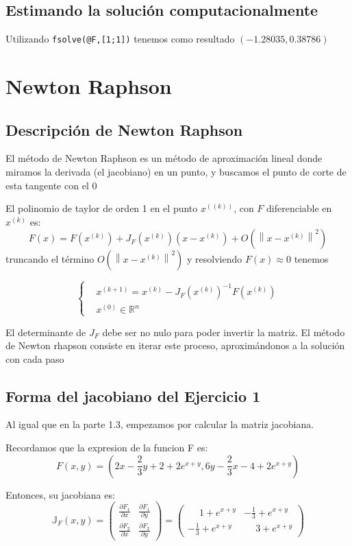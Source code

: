 \documentclass{endm}
\begin{document}
\subsection{Estimando la solución computacionalmente}
Utilizando \lstinline[style=mystyle]{fsolve(@F,[1;1])} tenemos como resultado $(-1.28035, 0.38786)$
\section{Newton Raphson}
\subsection{Descripción de Newton Raphson}
El método de Newton Raphson es un método de aproximación lineal donde miramos la derivada (el jacobiano) en un punto, y buscamos el punto de corte de esta tangente con el 0

El polinomio de taylor de orden 1 en el punto $x^((k))$, con $F$ diferenciable en $x^{(k)}$ es:
\begin{equation*}
F(x) = F(x^{(k)}) + J_F(x^{(k)})(x-x^{(k)})+O(\left \| x-x^{(k)} \right \|^2)
\end{equation*}
truncando el término $O(\left \| x-x^{(k)} \right \|^2)$ y resolviendo $F(x) \approx  0$ tenemos

\begin{equation}
\begin{cases}
 & x^{(k+1)} = x^{(k)} - J_F(x^{(k)})^{-1} F(x^{(k)}) \\
 & x^{(0)}  \in \mathbb{R}^n
\end{cases}
\end{equation}

El determinante de $J_F$ debe ser no nulo para poder invertir la matriz.
El método de Newton rhapson consiste en iterar este proceso, aproximándonos a la solución con cada paso
\subsection{Forma del jacobiano del Ejercicio 1}
Al igual que en la parte 1.3, empezamos por calcular la matriz jacobiana.
    
    Recordamos que la expresion de la funcion F es:
    \begin{equation*}
        F(x,y) = \left( 2x - \frac{2}{3}y + 2 + 2e^{x+y}, 6y - \frac{2}{3}x - 4 + 2e^{x+y} \right)
    \end{equation*}

    Entonces, su jacobiana es:
    \begin{equation}
        \mathbb{J}_F(x,y) =
        \begin{pmatrix}
            \frac{\partial F_1}{\partial x} & \frac{\partial F_1}{\partial y} \\
            \frac{\partial F_2}{\partial x} & \frac{\partial F_2}{\partial y}
        \end{pmatrix}
        =
        \begin{pmatrix}
            \phantom{-}1 + e^{x+y} & -\frac{1}{3} + e^{x+y} \\
            -\frac{1}{3} + e^{x+y} & \phantom{-}3 + e^{x+y}
        \end{pmatrix}
    \end{equation}
\end{document}
